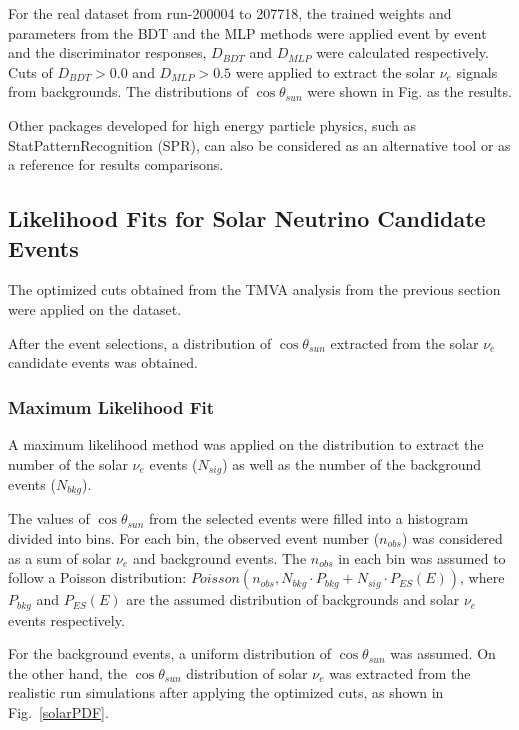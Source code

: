 For the real dataset from run-200004 to 207718, the trained weights and parameters from the BDT and the MLP methods were applied event by event and the discriminator responses, $D_{BDT}$ and $D_{MLP}$ were calculated respectively. Cuts of $D_{BDT}>0.0$ and $D_{MLP}>0.5$ were applied to extract the solar $\nu_e$ signals from backgrounds. The distributions of $\cos\theta_{sun}$ were shown in Fig. as the results.



Other packages developed for high energy particle physics, such as StatPatternRecognition (SPR)\cite{sprWebsite}, can also be considered as an alternative tool or as a reference for results comparisons. 

\subsection{Likelihood Fits for Solar Neutrino Candidate Events}
The optimized cuts obtained from the TMVA analysis from the previous section were applied on the dataset. 

After the event selections, a distribution of $\cos\theta_{sun}$ extracted from the solar $\nu_e$ candidate events was obtained. 

\subsubsection{Maximum Likelihood Fit}
A maximum likelihood method was applied on the distribution to extract the number of the solar $\nu_e$ events ($N_{sig}$) as well as the number of the background events ($N_{bkg}$).

The values of $\cos\theta_{sun}$ from the selected events were filled into a histogram divided into bins.
For each bin, the observed event number ($n_{obs}$) was considered as a sum of solar $\nu_e$ and background events. The $n_{obs}$ in each bin was assumed to follow a Poisson distribution: $Poisson(n_{obs}, N_{bkg}\cdot P_{bkg}+N_{sig}\cdot P_{ES}(E))$, where $P_{bkg}$ and $P_{ES}(E)$ are the assumed distribution of backgrounds and solar $\nu_e$ events respectively.

For the background events, a uniform distribution of $\cos\theta_{sun}$ was assumed. On the other hand, the $\cos\theta_{sun}$ distribution of solar $\nu_e$ was extracted from the realistic run simulations after applying the optimized cuts, as shown in Fig.~\ref{solarPDF}. 

